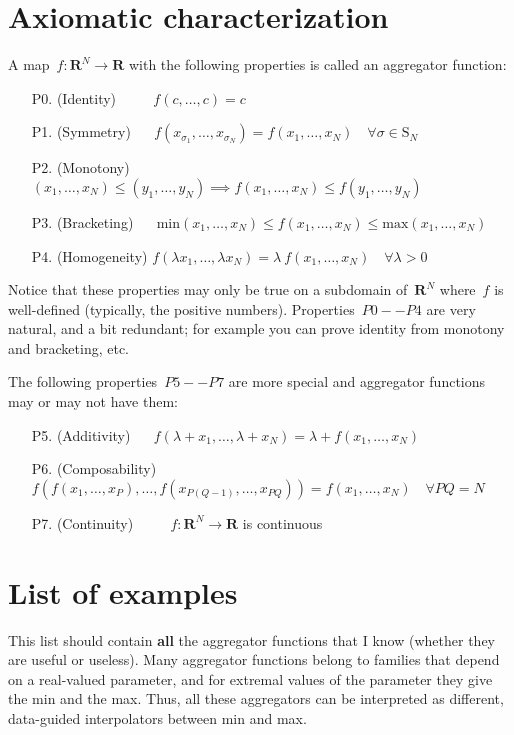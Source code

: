 \documentclass[a4paper]{article}
\def\R{\mathbf{R}}
\begin{document}
\section{Axiomatic characterization}

A map~$f:\R^N\to\R$ with the following properties
is called an aggregator function:
\begin{itemize}
	\item[P0.]
		(Identity)
		$\qquad$
		$f(c,\ldots,c)=c$
	\item[P1.]
		(Symmetry)
		$\quad$
		$f(x_{\sigma_1},\ldots,x_{\sigma_N})=f(x_1,\ldots,x_N)
		\quad
		\forall\sigma\in\mathrm{S}_N$
	\item[P2.]
		(Monotony)
		$\quad$
		$(x_1,\ldots,x_N)\le(y_1,\ldots,y_N)
		\implies
		f(x_1,\ldots,x_N)\le f(y_1,\ldots,y_N)$
	\item[P3.]
		(Bracketing)
		$\quad$
		$\mathrm{min}(x_1,\ldots,x_N)
		\le f(x_1,\ldots,x_N)
		\le \mathrm{max}(x_1,\ldots,x_N)$
	\item[P4.]
		(Homogeneity)
		$f(\lambda x_1,\ldots,\lambda x_N)
		=\lambda\ f(x_1,\ldots,x_N)
		\quad\forall\lambda >0$
\end{itemize}

Notice that these properties may only be true on a subdomain
of~$\R^N$ where~$f$ is well-defined (typically, the positive
numbers).  Properties~$P0--P4$ are very natural, and a bit redundant;
for example you can prove identity from monotony and bracketing, etc.

The following properties~$P5--P7$ are more special and aggregator
functions may or may not have them:

\begin{itemize}
	\item[P5.]
		(Additivity)
		$\quad$
		$f(\lambda+x_1,\ldots,\lambda+x_N)
		=\lambda+f(x_1,\ldots,x_N)$
	\item[P6.]
		(Composability)
		$f\left(f(x_1,\ldots,x_P),\ldots,f(x_{P(Q-1)},\ldots,x_{PQ})\right)
		=f(x_1,\ldots,x_N)\quad\forall PQ=N$
	\item[P7.]
		(Continuity)
		$\qquad$
		$f:\R^N\to\R$ is continuous
\end{itemize}

\section{List of examples}

This list should contain {\bf all} the aggregator functions that I
know (whether they are useful or useless).  Many aggregator functions
belong to families that depend on a real-valued parameter, and for
extremal values of the parameter they give the min and the max.
Thus, all these aggregators can be interpreted as different,
data-guided interpolators between min and max.
\end{document}
